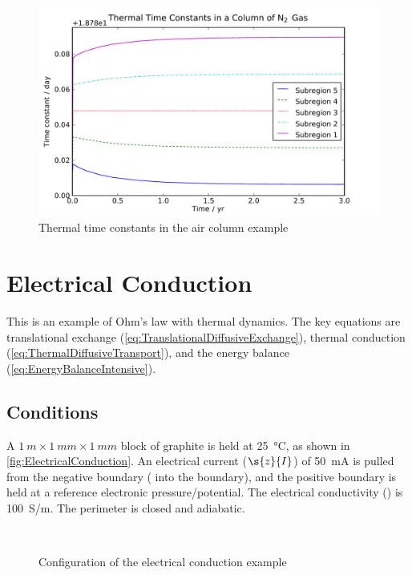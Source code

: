 \begin{figure}[htbp]
  \includegraphics[width=\linewidth]{Results/Basic/AirColumn/1/TimeConstants}%
  \caption{Thermal time constants in the air column example}
  \label{fig:AirColumnTimeConstants}
\end{figure}


\FloatBarrier %
\section{Electrical Conduction}

This is an example of Ohm's law with thermal dynamics.  The key equations are translational exchange (\autoref{eq:TranslationalDiffusiveExchange}), thermal conduction (\autoref{eq:ThermalDiffusiveTransport}), and the energy balance (\autoref{eq:EnergyBalanceIntensive}).

\subsection{Conditions}

A $\SI{1}{m}\times\SI{1}{mm}\times\SI{1}{mm}$ block of graphite is held at \SI{25}{\celsius}, as shown in \autoref{fig:ElectricalConduction}.  An electrical current ($\s{z}{I}$) of \SI{50}{mA} is pulled from the negative boundary ( into the boundary), and the positive boundary is held at a reference electronic pressure\slash{}potential.  The electrical conductivity () is \SI{100}{S/m}.  The perimeter is closed and adiabatic.

\begin{figure}[htbp]
  \\
  \caption{Configuration of the electrical conduction example}
  \label{fig:ElectricalConduction}
\end{figure}

